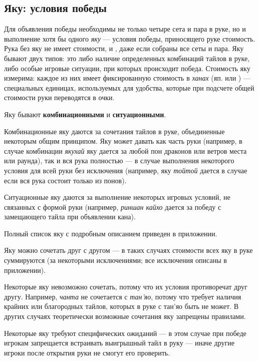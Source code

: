 \subsection{Яку: условия победы}

Для объявления победы необходимы не только четыре сета и пара в руке, но и выполнение хотя бы одного \textit{яку} --- условия победы, приносящего руке стоимость. Рука без яку не имеет стоимости, и , даже если собраны все сеты и пара. Яку бывают двух типов: это либо наличие определенных комбинаций тайлов в руке, либо особые игровые ситуации, при которых происходит победа. Стоимость яку измерима: каждое из них имеет фиксированную стоимость в \textit{ханах} (яп.  или ) --- специальных единицах, используемых для удобства, которые при подсчете общей стоимости руки переводятся в очки.

Яку бывают \textbf{комбинационными} и \textbf{ситуационными}. 

Комбинационные яку даются за сочетания тайлов в руке, объединенные некоторым общим принципом. Яку может давать как часть руки (например, в случае комбинации \textit{якухай} яку дается за любой пон драконов или ветров места или раунда), так и вся рука полностью --- в случае выполнения некоторого условия для всей руки без исключения (например, яку \textit{тойтой} дается в случае если вся рука состоит только из понов). 

Ситуационные яку даются за выполнение некоторых игровых условий, не связанных с формой руки (например, \textit{риншан кайхо} дается за победу с замещающего тайла при объявлении кана).

Полный список яку с подробным описанием приведен в приложении.

Яку можно сочетать друг с другом --- в таких случаях стоимости всех яку в руке суммируются (за некоторыми исключениями; все исключения описаны в приложении).

Некоторые яку невозможно сочетать, потому что их условия противоречат друг другу. Например, \textit{чанта} не сочетается с \textit{тан'яо}, потому что требует наличия крайних или благородных тайлов, которых в руке с тан'яо быть не может. В других случаях теоретически возможные сочетания яку запрещены правилами.

Некоторые яку требуют специфических ожиданий --- в этом случае при победе игрокам запрещается встраивать выигрышный тайл в руку --- иначе другие игроки после открытия руки не смогут его проверить.

